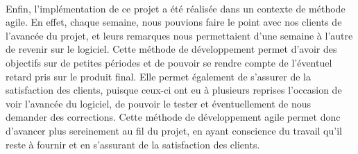 \paragraph{}
Enfin, l'implémentation de ce projet a été réalisée dans un contexte de méthode agile. En effet, chaque semaine, nous pouvions faire le point avec nos clients de l'avancée du projet, et leurs remarques nous permettaient d'une semaine à l'autre de revenir sur le logiciel. Cette méthode de développement permet d'avoir des objectifs sur de petites périodes et de pouvoir se rendre compte de l'éventuel retard pris sur le produit final. Elle permet également de s'assurer de la satisfaction des clients, puisque ceux-ci ont eu à plusieurs reprises l'occasion de voir l'avancée du logiciel, de pouvoir le tester et éventuellement de nous demander des corrections. Cette méthode de développement agile permet donc d'avancer plus sereinement au fil du projet, en ayant conscience du travail qu'il reste à fournir et en s'assurant de la satisfaction des clients.
